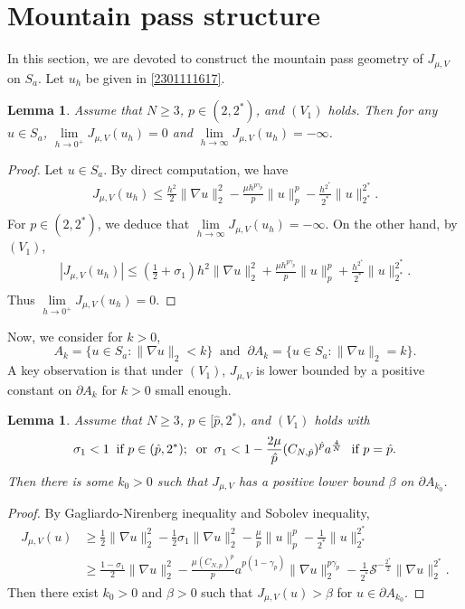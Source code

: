 \documentclass[10pt]{article}
\numberwithin{equation}{section}
\newtheorem{lemma}[theorem]{Lemma}
\numberwithin{equation}{section}
\begin{document}
\section{Mountain pass structure}\label{2306251339}
In this section, we are devoted to construct the mountain pass geometry of $J_{\mu, V}$ on $S_a$. Let $u_h$ be given in \eqref{2301111617}.
\begin{lemma}\label{2207232312}
Assume that $N\ge 3$, $p\in (2, 2^*)$, and $(V_1)$ holds. Then for any $u\in S_a$, $\underset{h\to 0^+}{\lim}J_{\mu, V}(u_h)=0$ and  $\underset{h\to \infty}{\lim}J_{\mu, V}(u_h)=-\infty$.
\end{lemma}
\begin{proof}
Let $u\in S_a$. By direct computation, we have
\[
\begin{aligned}
J_{\mu, V}(u_h)\le \frac{h^{2}}{2} \|\nabla u\|_2^2-\frac{\mu h^{p\gamma_p }}{p} \|u\|_p^p-\frac{h^{2^*}}{2^*}\|u\|_{2^*}^{2^*}.\\
\end{aligned}
\]
For $p\in (2, 2^*)$, we deduce that $\underset{h\to \infty}{\lim}J_{\mu, V}(u_h)=-\infty$.
On the other hand, by $(V_1)$,
\[
\begin{aligned}
\left| J_{\mu, V}(u_h)\right|\le \left(\frac12+\sigma_1\right) h^{2}\|\nabla u\|_2^2+\frac{\mu h^{p\gamma_p }}{p} \|u\|_p^p+\frac{h^{2^*}}{2^*}\|u\|_{2^*}^{2^*}.\\
\end{aligned}
\]
Thus $\underset{h\to 0^+}{\lim}J_{\mu, V}(u_h)=0$.
\end{proof}
Now, we consider for $k>0$,
\[
A_k=\{u\in S_a: \|\nabla u\|_2< k\}\;\;\text{and} \;\; \partial A_k=\{u\in S_a: \|\nabla u\|_2= k\}.
\]
A key observation is that under $(V_1)$, $J_{\mu, V}$ is lower bounded by a positive constant on $\partial A_k$ for $k>0$ small enough.
\begin{lemma}\label{2207232313}
Assume that $N\ge 3$, $p\in [\hat{p}, 2^*)$, and $(V_1)$ holds with
\begin{equation}\label{2301301540}
\sigma_1<1\;\; \text{if}~p\in (\hat{p}, 2^*);\;\; \text{or}\;\;\sigma_1<{1}-\frac{2\mu}{\hat{p}}(C_{N, \hat{p}})^{\hat{p}}a^{\frac4N}\;\;\, \text{if}~p=\hat{p}.\\
\end{equation}
Then there is some $k_0>0$ such that $J_{\mu, V}$ has a positive lower bound $\beta$ on $\partial A_{k_0}$.
\end{lemma}
\begin{proof}
By Gagliardo-Nirenberg inequality and Sobolev inequality,
\[
\begin{aligned}
J_{\mu, V}(u)&\ge \frac12 \|\nabla u\|_2^2-\frac12 \sigma_1\|\nabla u\|_{2}^2-\frac{\mu}{p} \|u\|_p^p-\frac{1}{2^*}\|u\|_{2^*}^{2^*}\\
&\ge \frac{1-\sigma_1}{2}\|\nabla u\|_2^2-\frac{\mu (C_{N,p})^p}{p}a^{{p(1-\gamma_p)}}\|\nabla u\|_2^{p\gamma_p}-\frac{1}{2^*}\mathcal{S}^{-\frac{2^*}{2}}\|\nabla u\|_2^{2^*}.
\end{aligned}
\]
Then there exist $k_0>0$ and  $\beta>0$ such that $J_{\mu, V}(u)>\beta$ for $u\in \partial A_{k_0}$.
\end{proof}
\end{document}
